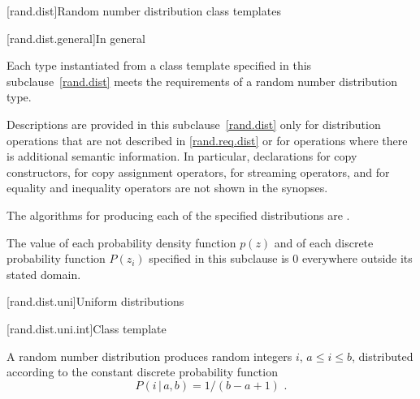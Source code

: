 



[rand.dist]{Random number distribution class templates}%

[rand.dist.general]{In general}

\pnum
Each type instantiated
from a class template specified in this subclause~\ref{rand.dist}
meets the requirements
of a random number distribution type.

\pnum
Descriptions are provided in this subclause~\ref{rand.dist}
only for distribution operations
that are not described in \ref{rand.req.dist}
or for operations where there is additional semantic information.
In particular,
declarations for copy constructors,
for copy assignment operators,
for streaming operators,
and for equality and inequality operators
are not shown in the synopses.

\pnum
The algorithms for producing each
of the specified distributions are
.

\pnum
The value of each probability density function $p(z)$
and of each discrete probability function $P(z_i)$
specified in this subclause
is $0$
everywhere outside its stated domain.


[rand.dist.uni]{Uniform distributions}%
%


[rand.dist.uni.int]{Class template }%
%

\pnum
A  random number distribution
produces random integers $i$,
$a \leq i \leq b$,
distributed according to
the constant discrete probability function%
\[  P(i\,|\,a,b) = 1 / (b - a + 1) \text{ .} \]

